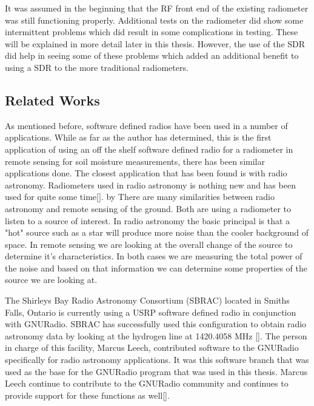 
It was assumed in the beginning that the RF front end of the existing radiometer was still functioning properly.  Additional tests on the radiometer did show some intermittent problems which did result in some complications in testing.  These will be explained in more detail later in this thesis.  However, the use of the SDR did help in seeing some of these problems which added an additional benefit to using a SDR to the more traditional radiometers.  

\subsection{Related Works}
As mentioned before, software defined radios have been used in a number of applications.  While as far as the author has determined, this is the first application of using an off the shelf software defined radio for a radiometer in remote sensing for soil moisture measurements, there has been similar applications done.  The closest application that has been found is with radio astronomy.  Radiometers used in radio astronomy is nothing new and has been used for quite some time[\cite{Ohm}]. by There are many similarities between radio astronomy and remote sensing of the ground.  Both are using a radiometer to listen to a source of interest.  In radio astronomy the basic principal is that a "hot" source such as a star will produce more noise than the cooler background of space.  In remote sensing we are looking at the overall change of the source to determine it's characteristics.  In both cases we are measuring the total power of the noise and based on that information we can determine some properties of the source we are looking at.

The Shirleys Bay Radio Astronomy Consortium (SBRAC) located in Smiths Falls, Ontario is currently using a USRP software defined radio in conjunction with GNURadio.  SBRAC has successfully used this configuration to obtain radio astronomy data by looking at the hydrogen line at 1420.4058 MHz [\cite{Leech2007}].  The person in charge of this facility, Marcus Leech, contributed software to the GNURadio specifically for radio astronomy applications.  It was this software branch that was used as the base for the GNURadio program that was used in this thesis.  Marcus Leech continue to contribute to the GNURadio community and continues to provide support for these functions as well[\cite{Leech}].

